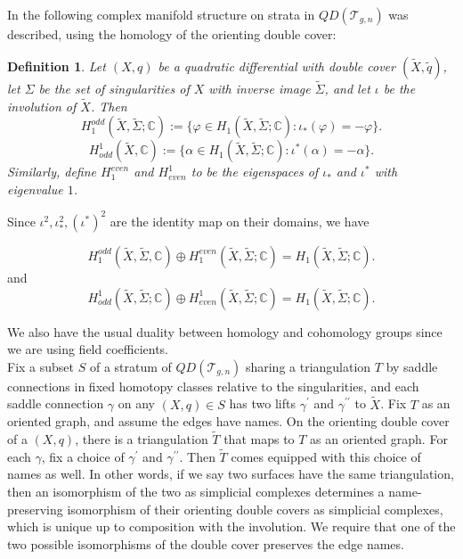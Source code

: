 \documentclass[12pt]{article}
\newtheorem{definition}[theorem]{Definition}
\newcommand{\cc}{\mathbb{C}}
\begin{document}
\noindent In \cite{ietsandmfs} the following complex manifold structure on strata in $QD(\mathcal{T}_{g,n})$ was described, using the homology of the orienting double cover:

\begin{definition}Let $(X,q)$ be a quadratic differential with double cover $(\tilde{X},\tilde{q})$, let $\Sigma$ be the set of singularities of $X$ with inverse image $\tilde{\Sigma}$, and let $\iota$ be the involution of $\tilde{X}$. Then $$H_1^{odd}(\tilde{X},\tilde{\Sigma}; \cc) := \{\varphi \in H_1(\tilde{X},\tilde{\Sigma}; \cc): \iota_*(\varphi) = -\varphi\}.$$ $$H_{odd}^1(\tilde{X}, \cc) := \{\alpha \in H_1(\tilde{X},\tilde{\Sigma}; \cc): \iota^*(\alpha) = -\alpha\}.$$ Similarly, define $H_1^{even}$ and $H_{even}^1$ to be the eigenspaces of $\iota_*$ and $\iota^*$ with eigenvalue $1$. \end{definition}

\noindent Since $\iota^2, \iota_*^2, (\iota^*)^2$ are the identity map on their domains, we have

$$H_1^{odd}(\tilde{X},\tilde{\Sigma}, \cc) \oplus H_1^{even}(\tilde{X},\tilde{\Sigma}; \cc) = H_1(\tilde{X},\tilde{\Sigma}; \cc).$$ and 
$$H_{odd}^1(\tilde{X},\tilde{\Sigma}; \cc) \oplus H_{even}^1(\tilde{X},\tilde{\Sigma}; \cc) = H_1(\tilde{X},\tilde{\Sigma}; \cc).$$

\noindent We also have the usual duality between homology and cohomology groups since we are using field coefficients.\\

\noindent Fix a subset $S$ of a stratum of $QD(\mathcal{T}_{g,n})$ sharing a triangulation $T$ by saddle connections in fixed homotopy classes relative to the singularities, and each saddle connection $\gamma$ on any $(X,q) \in S$ has two lifts $\gamma^\prime$ and $\gamma^{\prime\prime}$ to $\tilde{X}$. Fix $T$ as an oriented graph, and assume the edges have names. On the orienting double cover of a $(X,q)$, there is a triangulation $\tilde{T}$ that maps to $T$ as an oriented graph. For each $\gamma$, fix a choice of $\gamma^\prime$ and $\gamma^{\prime\prime}$. Then $\tilde{T}$ comes equipped with this choice of names as well. In other words, if we say two surfaces have the same triangulation, then an isomorphism of the two as simplicial complexes determines a name-preserving isomorphism of their orienting double covers as simplicial complexes, which is unique up to composition with the involution. We require that one of the two possible isomorphisms of the double cover preserves the edge names.
\end{document}
